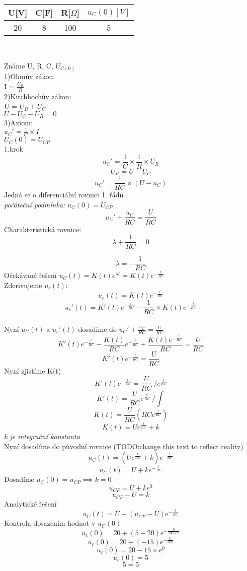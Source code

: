 \documentclass[12pt]{article}
\begin{document}
\begin{center}
\begin{tabular}{| c | c | c | c |}
\hline
U[V] & C[F] & R[$\Omega$] & $u_{C}(0)[V]$ \\
\hline
20 & 8 & 100 & 5\\
\hline
\end{tabular}\\
\end{center}
Známe U, R, C, $U_{C(0)}$\\
1)Ohmův zákon:\\ I = $\frac{U_{R}}{R}$\\
2)Kirchhochův zákon:\\ U = $U_{R}+U_{C}$\\ $U-U_{C}-U_{R}=0$\\
3)Axiom:\\$u_{C}'=\frac{1}{C} \times I$\\ $U_{C}(0)=U_{CP}$\\
1.krok\\
\[
  u_{C}'=\displaystyle\frac{1}{C} \times \displaystyle\frac{1}{R} \times U_{R}
\]
\[
  U_{R} = U-U_{C}
\]
\[
  u_{C}'=\displaystyle\frac{1}{RC} \times (U-u_{C})
\]
Jedná se o diferenciální rovnici 1. řádu\\
\textit{počáteční podmínka:} $u_{C}(0)=U_{CP}$\\
\[
  u_{C}'+\displaystyle\frac{u_{C}}{RC}= \displaystyle\frac{U}{RC}
\]
Charakteristická rovnice:
\[
  \lambda + \displaystyle\frac{1}{RC}=0
\]

\[
  \lambda =-\displaystyle\frac{1}{RC}
\]
Očekávané řešení $u_{C}(t)=K(t)e^{\lambda t} = K(t)e^{-\frac{t}{RC}}$\\
Zderivujeme $u_{c}(t)$:
\[
  u_{c}(t) = K(t)e^{-\frac{t}{RC}}
\]
\[
  u_{c}'(t)=K'(t)e^{-\frac{t}{RC}}- \displaystyle\frac{1}{RC} \times K(t)e^{-\frac{t}{RC}}
\]\\
Nyní $u_{C}(t)$ a $u_{c}'(t)$ dosadíme do $u_{C}'+\frac{u_{C}}{RC}=\frac{U}{RC}$
\[
  K'(t)e^{-\frac{t}{RC}}-\displaystyle\frac{K(t)}{RC}e^{-\frac{t}{RC}}+\displaystyle\frac{K(t)e^{-\frac{t}{RC}}}{RC}=\displaystyle\frac{U}{RC}
\]
\[
  K'(t)e^{-\frac{t}{RC}}=\displaystyle\frac{U}{RC}
\]
Nyní zjistíme K(t)
\[
  K'(t)e^{-\frac{t}{RC}}=\displaystyle\frac{U}{RC}\ /e^{\frac{t}{RC}}
\]
\[
  K'(t)=\displaystyle\frac{U}{RC}e^{\frac{t}{RC}}\ /\int{}{}
\]
\[
  K(t)=\displaystyle\frac{U}{RC}(RCe^{\frac{t}{RC}})
\]
\[
  K(t)=Ue^{\frac{t}{RC}}+k
\]
\textit{k je integrační konstanta}\\

Nyní dosadíme do původní rovnice (TODO:change this text to reflect reality)
\[
  u_{C}(t) = (Ue^{\frac{t}{RC}}+k)e^{-\frac{t}{RC}}
\]
\[
  u_{C}(t)=U+ke^{-\frac{t}{RC}}
\]
Dosadíme $u_{C}(0)=u_{CP}\implies k=0$
\[
  u_{CP}=U+ke^{0}
\]
\[
  u_{CP}-U=k
\]
Analytické řešení
\[
  u_{C}(t) = U + (u_{CP}-U)e^{-\frac{t}{RC}}
\]
Kontrola dosazením hodnot v $u_{C}(0)$
\[
  u_{c}(0) = 20 + (5-20)e^{-\frac{0}{100 \times 8}}
\]
\[
  u_{c}(0) = 20 + (-15)e^{-\frac{0}{800}}
\]
\[
  u_{c}(0) = 20 -15 \times e^{0}
\]
\[
  u_{c}(0) = 5 
\]
\[
  5=5
\]
\end{document}
